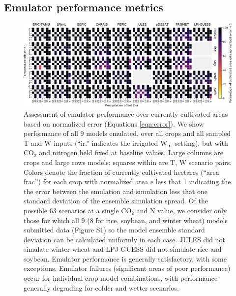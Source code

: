 \documentclass[gmd, manuscript]{copernicus} %
\begin{document}
\subsection{Emulator performance metrics}
\label{S:4.2}
\begin{figure}[ht]
\centering
    \includegraphics[width=16.3cm]{figures/error_grid_new.png}
    \caption{
    Assessment of emulator performance over currently cultivated areas based on normalized error (Equations \ref{eqn:error}). 
    We show performance of all 9 models emulated, over all crops and all sampled T and W inputs (``ir.'' indicates the irrigated W$_{\infty}$ setting), but with CO$_2$ and nitrogen held fixed at baseline values. 
    Large columns are crops and large rows models; squares within are T, W scenario pairs. 
    Colors denote the fraction of currently cultivated hectares (``area frac'') for each crop with normalized area $e$ less that 1 indicating the the error between the emulation and simulation less that one standard deviation of the ensemble simulation spread. 
    Of the possible 63 scenarios at a single CO$_2$ and N value, we consider only those for which all 9 (8 for rice, soybean, and winter wheat) models submitted data (Figure S1) so the model ensemble standard deviation can be calculated uniformly in each case. 
    JULES did not simulate winter wheat and LPJ-GUESS did not simulate rice and soybean. Emulator performance is generally satisfactory, with some exceptions. 
    Emulator failures (significant areas of poor performance) occur for individual crop-model combinations, with performance generally degrading for colder and wetter scenarios.
    }
   \label{fig:error_360}
\end{figure}
\end{document}

